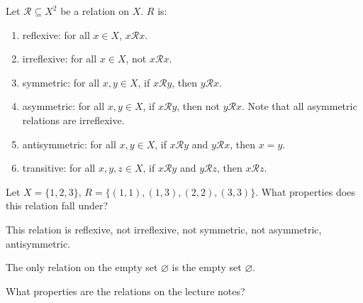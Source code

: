 \begin{property}
	Let \( \mathcal{R} \subseteq X^2 \) be a relation on \( X \). \( R \) is:
	\begin{enumerate}
		\item reflexive: for all \( x \in X \), \( x \mathcal{R}x \).
		\item irreflexive: for all \( x \in X \), not \( x \mathcal{R}x \).
		\item symmetric: for all \( x,y \in X \), if \( x\mathcal{R}y \), then \(y\mathcal{R}x \).
		\item asymmetric: for all \( x,y \in X \), if \( x \mathcal{R}y \), then not \( y\mathcal{R}x \). Note that all asymmetric relations are irreflexive.
		\item antisymmetric: for all \( x,y \in X \), if \( x \mathcal{R}y \) and \( y\mathcal{R}x \), then \( x=y \).
		\item transitive: for all \( x,y,z \in X \), if \( x \mathcal{R}y \) and \( y\mathcal{R}z \), then \( x\mathcal{R}z \).
	\end{enumerate}
\end{property}

\begin{eg}
	Let \( X=\{1,2,3\}   \), \( R=\{(1,1),(1,3),(2,2),(3,3)\}   \). What properties does this relation fall under?
\end{eg}

This relation is reflexive, not irreflexive, not symmetric, not asymmetric, antisymmetric.

\begin{note}
	The only relation on the empty set \( \varnothing \) is the empty set \( \varnothing \).
\end{note}

What properties are the relations on the lecture notes?
